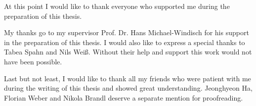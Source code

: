 \thispagestyle{plain}

At this point I would like to thank everyone who supported me during the preparation of this thesis.

My thanks go to my supervisor Prof. Dr. Hans Michael-Windisch for his support in the preparation of this thesis. I would also like to express a special thanks to Tabea Spahn and Nils Weiß. Without their help and support this work would not have been possible.

Last but not least, I would like to thank all my friends who were patient with me during the writing of this thesis and showed great understanding. Jeonghyeon Ha, Florian Weber and Nikola Brandl deserve a separate mention for proofreading.
